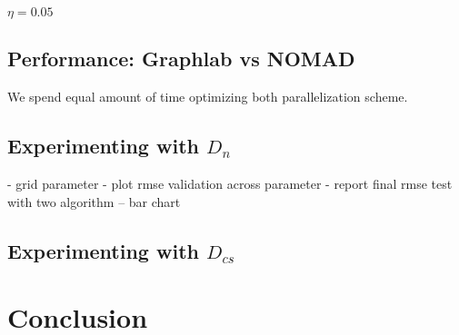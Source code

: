 \documentclass{article} %
\begin{document}
	$\eta=0.05$

	\subsection{Performance: Graphlab vs NOMAD}

	We spend equal amount of time optimizing both parallelization scheme.

	\subsection{Experimenting with $D_n$}

	- grid parameter
	- plot rmse validation across parameter
	- report final rmse test with two algorithm -- bar chart

	\subsection{Experimenting with $D_{cs}$}


	\section{Conclusion}


	
	{}
\end{document}
